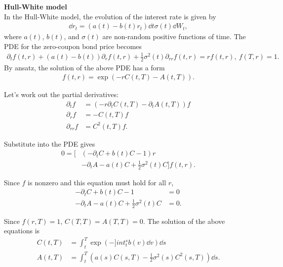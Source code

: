 \documentclass[square]{article} %
\theoremstyle{plain}
\theoremstyle{definition} %
\begin{document}
{\bf Hull-White model}\\
In the Hull-White model, the evolution of the interest rate is given by 
\begin{align*}
\dd r_t = \left(a(t)-b(t)r_t\right)\dd t \sigma(t) \dd W_t,
\end{align*}
where $a(t)$, $b(t)$, and $\sigma(t)$ are non-random positive functions of time.
The PDE for the zero-coupon bond price becomes
\begin{align*}
  \partial_t f(t,r) + \left(a(t)-b(t)\right)\partial_r f(t,r)+ \frac{1}{2}\sigma^2(t)\partial_{rr}f(t,r) = r f(t,r),\  
  f(T, r)=1.
  \end{align*}
By ansatz, the solution of the above PDE has a form 
\begin{align*}
f(t,r) = \exp\left(-r C(t,T)- A(t,T)\right).
\end{align*}

Let's work out the partial derivatives:
\begin{align*}
  \partial_t f &= \left(-r \partial_t C(t,T) - \partial_t A(t,T)\right) f\\
  \partial_r f &= -C(t,T)f\\
  \partial_{rr} f &= C^2(t,T)f.
\end{align*}

Substitute into the PDE gives
\begin{align*}
0=\Big[
&\left(
-\partial_t C+ b(t)C-1
\right)r\\
&-\partial_t A - a(t)C+\frac{1}{2}\sigma^2(t)C
\Big]f(t,r).
\end{align*}
 
Since $f$ is nonzero and this equation must hold for all $r$, 
\begin{align*}
  -\partial_t C+ b(t)C-1 &=0\\
  -\partial_t A - a(t)C+\frac{1}{2}\sigma^2(t)C &=0.
\end{align*}

Since $f(r,T)=1$, $C(T,T)=A(T,T)=0$. The solution of the above equations is 
\begin{align*}
  C(t,T) &= \int_t^T \exp\left(-]int_t^s b(v)\dd v\right)\dd s\\
  A(t,T) &= \int_t^T \left(a(s) C(s,T)-\frac{1}{2}\sigma^2(s)C^2(s,T)\right)\dd s.
\end{align*}


\end{document}
